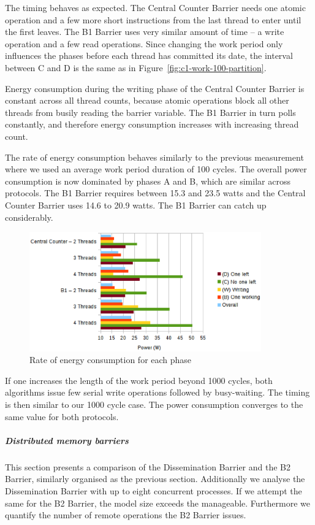 \documentclass[a4paper, 10pt]{article}
\begin{document}
The timing behaves as expected. The Central Counter Barrier needs one atomic operation and a few more short instructions from the last thread to enter until the first leaves. The B1 Barrier uses very similar amount of time -- a write operation and a few read operations.
Since changing the work period only influences the phases before each thread has committed its date, the interval between C and D is the same as in Figure~\ref{fig:c1-work-100-partition}.

Energy consumption during the writing phase of the Central Counter Barrier is constant across all thread counts, because atomic operations block all other threads from busily reading the barrier variable.
The B1 Barrier in turn polls constantly, and therefore energy consumption increases with increasing thread count.

The rate of energy consumption behaves similarly to the previous measurement where we used an average work period duration of 100 cycles.
The overall power consumption is now dominated by phases A and B, which are similar across protocols. The B1 Barrier requires between 15.3 and 23.5 watts and the Central Counter Barrier uses 14.6 to 20.9 watts. The B1 Barrier can catch up considerably.
\begin{figure}[htbp]
	\centering
	\includegraphics[width=10cm]{charts/c1-power-work-1000}
	\caption{Rate of energy consumption for each phase}
	\label{fig:c1-power-work-1000}
\end{figure}

If one increases the length of the work period beyond 1000 cycles, both algorithms issue few serial write operations followed by busy-waiting. The timing is then similar to our 1000 cycle case. The power consumption converges to the same value for both protocols.

\subparagraph{Distributed memory barriers}
\label{sssssec:analysis-modelchecking-quantitative-properties-evaluation-distributed}
This section presents a comparison of the Dissemination Barrier and the B2 Barrier, similarly organised as the previous section.
Additionally we analyse the Dissemination Barrier with up to eight concurrent processes.
If we attempt the same for the B2 Barrier, the model size exceeds the manageable.
Furthermore we quantify the number of remote operations the B2 Barrier issues.
\end{document}
